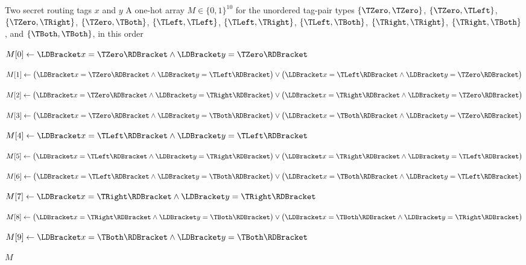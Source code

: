 \begin{algorithm}[t]
\caption{$\OFRPairMask(x,y)$}
\label{alg:ofr-pair-mask}
\begin{algorithmic}[1]
\Require Two secret routing tags $x$ and $y$
\Ensure A one-hot array $M\in\{0,1\}^{10}$ for the unordered tag-pair types
$\{\TZero,\TZero\}$, $\{\TZero,\TLeft\}$, $\{\TZero,\TRight\}$, $\{\TZero,\TBoth\}$,
$\{\TLeft,\TLeft\}$, $\{\TLeft,\TRight\}$, $\{\TLeft,\TBoth\}$, $\{\TRight,\TRight\}$,
$\{\TRight,\TBoth\}$, and $\{\TBoth,\TBoth\}$, in this order

\State $M[0]\gets
       \LDBracket x=\TZero \RDBracket
       \land
       \LDBracket y=\TZero \RDBracket$

\State $M[1]\gets
       \bigl(
       \LDBracket x=\TZero \RDBracket
       \land
       \LDBracket y=\TLeft \RDBracket
       \bigr)
       \lor
       \bigl(
       \LDBracket x=\TLeft \RDBracket
       \land
       \LDBracket y=\TZero \RDBracket
       \bigr)$

\State $M[2]\gets
       \bigl(
       \LDBracket x=\TZero \RDBracket
       \land
       \LDBracket y=\TRight \RDBracket
       \bigr)
       \lor
       \bigl(
       \LDBracket x=\TRight \RDBracket
       \land
       \LDBracket y=\TZero \RDBracket
       \bigr)$

\State $M[3]\gets
       \bigl(
       \LDBracket x=\TZero \RDBracket
       \land
       \LDBracket y=\TBoth \RDBracket
       \bigr)
       \lor
       \bigl(
       \LDBracket x=\TBoth \RDBracket
       \land
       \LDBracket y=\TZero \RDBracket
       \bigr)$

\State $M[4]\gets
       \LDBracket x=\TLeft \RDBracket
       \land
       \LDBracket y=\TLeft \RDBracket$

\State $M[5]\gets
       \bigl(
       \LDBracket x=\TLeft \RDBracket
       \land
       \LDBracket y=\TRight \RDBracket
       \bigr)
       \lor
       \bigl(
       \LDBracket x=\TRight \RDBracket
       \land
       \LDBracket y=\TLeft \RDBracket
       \bigr)$

\State $M[6]\gets
       \bigl(
       \LDBracket x=\TLeft \RDBracket
       \land
       \LDBracket y=\TBoth \RDBracket
       \bigr)
       \lor
       \bigl(
       \LDBracket x=\TBoth \RDBracket
       \land
       \LDBracket y=\TLeft \RDBracket
       \bigr)$

\State $M[7]\gets
       \LDBracket x=\TRight \RDBracket
       \land
       \LDBracket y=\TRight \RDBracket$

\State $M[8]\gets
       \bigl(
       \LDBracket x=\TRight \RDBracket
       \land
       \LDBracket y=\TBoth \RDBracket
       \bigr)
       \lor
       \bigl(
       \LDBracket x=\TBoth \RDBracket
       \land
       \LDBracket y=\TRight \RDBracket
       \bigr)$

\State $M[9]\gets
       \LDBracket x=\TBoth \RDBracket
       \land
       \LDBracket y=\TBoth \RDBracket$

\State \Return $M$
\end{algorithmic}
\end{algorithm}


